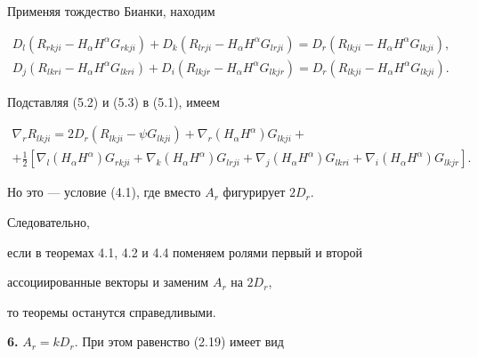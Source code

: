 Применяя тождество Бианки, находим


\begin{gather}


D_l(R_{rkji}-H_\alpha H^\alpha G_{rkji})+


D_k(R_{lrji}-H_\alpha H^\alpha G_{lrji})=


D_r(R_{lkji}-H_\alpha H^\alpha G_{lkji}),\tag{5.2} \\


D_j(R_{lkri}-H_\alpha H^\alpha G_{lkri})+


D_i(R_{lkjr}-H_\alpha H^\alpha G_{lkjr})=


D_r(R_{lkji}-H_\alpha H^\alpha G_{lkji}).\tag{5.3}


\end{gather}


Подставляя (5.2) и (5.3) в (5.1), имеем


\begin{multline*}


\nabla_r R_{lkji}=2D_r(R_{lkji}-\psi G_{lkji})+


\nabla_r(H_\alpha H^\alpha)G_{lkji}+ \\


+\tfrac{1}{2}[


\nabla_l(H_\alpha H^\alpha)G_{rkji}+


\nabla_k(H_\alpha H^\alpha)G_{lrji}+


\nabla_j(H_\alpha H^\alpha)G_{lkri}+


\nabla_i(H_\alpha H^\alpha)G_{lkjr}].


\end{multline*}


Но это --- условие (4.1), где вместо $A_r$ фигурирует $2D_r$.


Следовательно,


если в теоремах 4.1, 4.2 и 4.4 поменяем ролями первый и второй


ассоциированные векторы и заменим $A_r$ на $2D_r$,


то теоремы останутся справедливыми.





{\bf 6.} $A_r=k D_r$. При этом равенство (2.19) имеет вид


